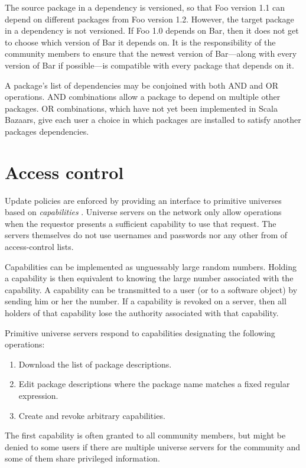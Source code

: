 \documentclass{article}
\begin{document}
The source package in a dependency is versioned, so that Foo version
1.1 can depend on different packages from Foo version 1.2.  However,
the target package in a dependency is not versioned.  If Foo 1.0
depends on Bar, then it does not get to choose which version of Bar it
depends on.  It is the responsibility of the community members to
ensure that the newest version of Bar---along with every version of
Bar if possible---is compatible with every package that depends on it.

A package's list of dependencies may be conjoined with both AND and OR
operations.  AND combinations allow a package to depend on multiple
other packages.  OR combinations, which have not yet been implemented
in Scala Bazaars, give each user a choice in which packages are
installed to satisfy another packages dependencies.


\section{Access control}

Update policies are enforced by providing an interface to primitive
universes based on \emph{capabilities} \cite{miller00:caps}.  Universe
servers on the network only allow operations when the requestor
presents a sufficient capability to use that request.  The servers
themselves do not use usernames and passwords nor any other from of
access-control lists.

Capabilities can be implemented as unguessably large random numbers.
Holding a capability is then equivalent to knowing the large number
associated with the capability.  A capability can be transmitted to a
user (or to a software object) by sending him or her the number.  If a
capability is revoked on a server, then all holders of that capability
lose the authority associated with that capability.


Primitive universe servers respond to capabilities designating the
following operations:
\begin{enumerate}
\item Download the list of package descriptions.
\item Edit package descriptions where the package
      name matches a fixed regular expression.
\item Create and revoke arbitrary capabilities.
\end{enumerate}
The first capability is often granted to all community members, but
might be denied to some users if there are multiple universe servers
for the community and some of them share privileged information.
\end{document}
